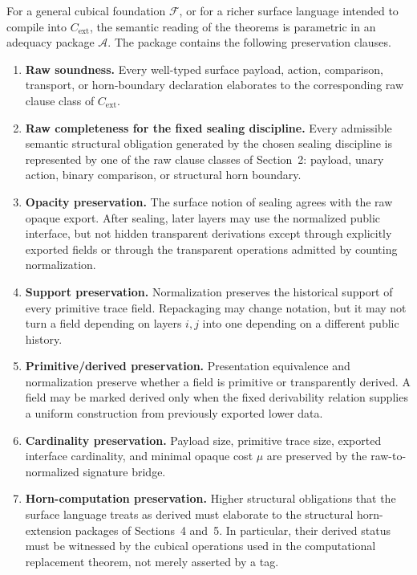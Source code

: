 \begin{remark}
For a general cubical foundation \(\mathcal F\), or for a richer surface language intended to
compile into \(C_{\mathrm{ext}}\), the semantic reading of the theorems is parametric in an
adequacy package \(\mathcal A\).  The package contains the following preservation clauses.

\begin{enumerate}
\item \textbf{Raw soundness.}  Every well-typed surface payload, action, comparison,
transport, or horn-boundary declaration elaborates to the corresponding raw clause class of
\(C_{\mathrm{ext}}\).

\item \textbf{Raw completeness for the fixed sealing discipline.}  Every admissible semantic
structural obligation generated by the chosen sealing discipline is represented by one of the
raw clause classes of Section~2: payload, unary action, binary comparison, or structural horn
boundary.

\item \textbf{Opacity preservation.}  The surface notion of sealing agrees with the raw opaque
export.  After sealing, later layers may use the normalized public interface, but not hidden
transparent derivations except through explicitly exported fields or through the transparent
operations admitted by counting normalization.

\item \textbf{Support preservation.}  Normalization preserves the historical support of every
primitive trace field.  Repackaging may change notation, but it may not turn a field depending
on layers \(i,j\) into one depending on a different public history.

\item \textbf{Primitive/derived preservation.}  Presentation equivalence and normalization
preserve whether a field is primitive or transparently derived.  A field may be marked derived
only when the fixed derivability relation supplies a uniform construction from previously
exported lower data.

\item \textbf{Cardinality preservation.}  Payload size, primitive trace size, exported
interface cardinality, and minimal opaque cost \(\mu\) are preserved by the raw-to-normalized
signature bridge.

\item \textbf{Horn-computation preservation.}  Higher structural obligations that the surface
language treats as derived must elaborate to the structural horn-extension packages of
Sections~4 and~5.  In particular, their derived status must be witnessed by the cubical
operations used in the computational replacement theorem, not merely asserted by a tag.


\end{enumerate}
\end{remark}
